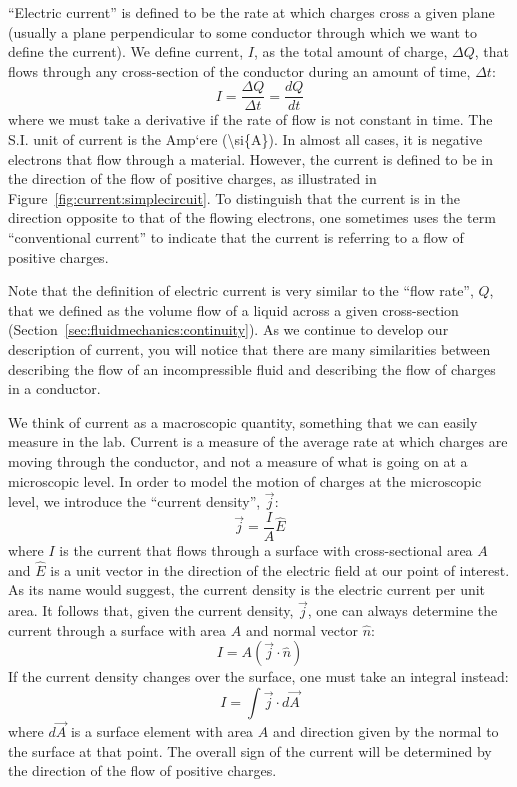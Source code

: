 ``Electric current'' is defined to be the rate at which charges cross a given plane (usually a plane perpendicular to some conductor through which we want to define the current). We define current, $I$, as the total amount of charge, $\Delta Q$, that flows through any cross-section of the conductor during an amount of time, $\Delta t$:
\begin{equation}
\boxed{I=\frac{\Delta Q}{\Delta t}=\frac{dQ}{dt}}
\end{equation}
where we must take a derivative if the rate of flow is not constant in time. The S.I. unit of current is the Amp`ere ({\textbackslash}si\{A\}). In almost all cases, it is negative electrons that flow through a material. However, the current is defined to be in the direction of the flow of positive charges, as illustrated in Figure~\ref{fig:current:simplecircuit}. To distinguish that the current is in the direction opposite to that of the flowing electrons, one sometimes uses the term ``conventional current'' to indicate that the current is referring to a flow of positive charges.

Note that the definition of electric current is very similar to the ``flow rate'', $Q$, that we defined as the volume flow of a liquid across a given cross-section (Section~\ref{sec:fluidmechanics:continuity}). As we continue to develop our description of current, you will notice that there are many similarities between describing the flow of an incompressible fluid and describing the flow of charges in a conductor.

We think of current as a macroscopic quantity, something that we can easily measure in the lab. Current is a measure of the average rate at which charges are moving through the conductor, and not a measure of what is going on at a microscopic level. In order to model the motion of charges at the microscopic level, we introduce the ``current density'', $\vec j$:
\begin{equation}
\boxed{\vec j = \frac{I}{A}\hat E}
\end{equation}
where $I$ is the current that flows through a surface with cross-sectional area $A$ and $\hat E$ is a unit vector in the direction of the electric field at our point of interest. As its name would suggest, the current density is the electric current per unit area. It follows that, given the current density, $\vec j$, one can always determine the current through a surface with area $A$ and normal vector $\hat n$:
\begin{equation}
I = A(\vec j\cdot \hat n)
\end{equation}
If the current density changes over the surface, one must take an integral instead:
\begin{equation}
I=\int \vec j \cdot d\vec A
\end{equation}
where $d\vec A$ is a surface element with area $A$ and direction given by the normal to the surface at that point. The overall sign of the current will be determined by the direction of the flow of positive charges.

